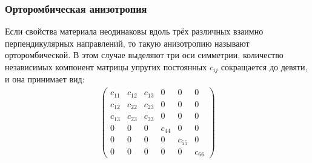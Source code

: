 \subsubsection{Орторомбическая анизотропия}

	Если свойства материала неодинаковы вдоль трёх различных взаимно перпендикулярных направлений, то такую анизотропию называют орторомбической.
	В этом случае выделяют три оси симметрии, количество независимых компонент матрицы упругих постоянных $c_{ij}$ сокращается до девяти, и она принимает вид:
\begin{align}
\label{orthorombic_tensor}
\left( \begin{array}{cccccccccccc}
c_{11} & c_{12} & c_{13} & 0 & 0 & 0 \\ 
c_{12} & c_{22} & c_{23} & 0 & 0 & 0 \\ 
c_{13} & c_{23} & c_{33} & 0 & 0 & 0 \\ 
0 & 0 & 0 & c_{44} & 0 & 0 \\ 
0 & 0 & 0 & 0 & c_{55} & 0 \\ 
0 & 0 & 0 & 0 & 0 & c_{66}
\end{array} \right){}
\end{align}

